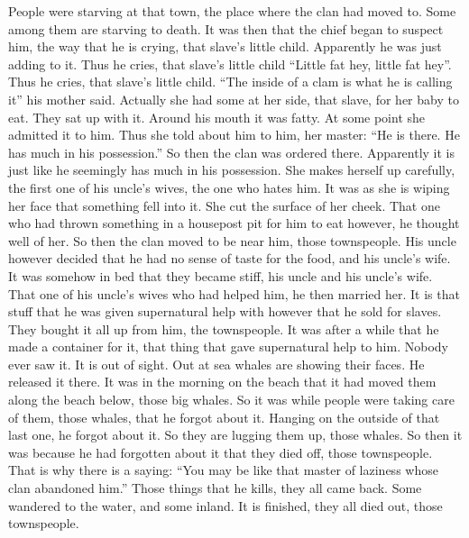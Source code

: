 \begin{pairs}
\begin{Rightside}
People were starving at that town, the place where the clan had moved to.
Some among them are starving to death.
It was then that the chief began to suspect him, the way that he is crying, that slave’s little child.
Apparently he was just adding to it.
Thus he cries, that slave’s little child
\qqk{}“Little fat hey, little fat hey”.
Thus he cries, that slave’s little child.
\qqk{}“The inside of a clam is what he is calling it” his mother said.
Actually she had some at her side, that slave, for her baby to eat.
They sat up with it.
Around his mouth it was fatty.
At some point she admitted it to him.
Thus she told about him to him, her master:
\qqk{}“He is there.
He has much in his possession.”
\pend
\pstart
{}So then the clan was ordered there.
Apparently it is just like he seemingly has much in his possession.
She makes herself up carefully, the first one of his uncle’s wives, the one who hates him.
It was as she is wiping her face that something fell into it.
She cut the surface of her cheek.
That one who had thrown something in a housepost pit for him to eat however, he thought well of her.
So then the clan moved to be near him, those townspeople.
His uncle however decided that he had no sense of taste for the food, and his uncle’s wife.
It was somehow in bed that they became stiff, his uncle and his uncle’s wife.
That one of his uncle’s wives who had helped him, he then married her.
It is that stuff that he was given supernatural help with however that he sold for slaves.
They bought it all up from him, the townspeople.
It was after a while that he made a container for it, that thing that gave supernatural help to him.
Nobody ever saw it.
It is out of sight.
\pend
\pstart
{}Out at sea whales are showing their faces.
He released it there.
It was in the morning on the beach that it had moved them along the beach below, those big whales.
So it was while people were taking care of them, those whales, that he forgot about it.
Hanging on the outside of that last one, he forgot about it.
So they are lugging them up, those whales.
So then it was because he had forgotten about it that they died off, those townspeople.
That is why there is a saying:
\qqk{}“You may be like that master of laziness whose clan abandoned him.”
Those things that he kills, they all came back.
Some wandered to the water, and some inland.
It is finished, they all died out, those townspeople.
\pend
\endnumbering
\end{Rightside}
\end{pairs}
\Columns

